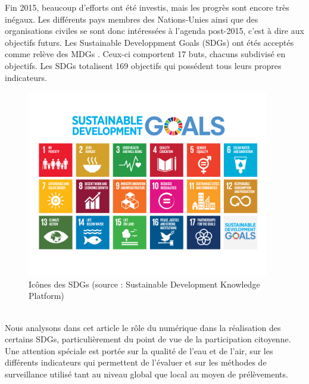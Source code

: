 \documentclass[10pt, article]{llncs}
\begin{document}
	Fin 2015, beaucoup d'efforts ont été investis, mais les progrès sont encore très inégaux. Les différents pays membres des Nations-Unies ainsi que des organisations civiles se sont donc intéressées à l'agenda post-2015, c'est à dire aux objectifs futurs. Les Sustainable Developpment Goals (SDGs) ont étés acceptés comme relève des MDGs \cite{wikipedia_sustainable_2017}. Ceux-ci comportent 17 buts, chacuns subdivisé en objectifs. Les SDGs totalisent 169 objectifs qui possédent tous leurs propres indicateurs.
	\begin{figure}
		\begin{center}
			\includegraphics[width=300pt]{img/sdgs.png}
		\end{center}
		\caption{Icônes des SDGs (source : Sustainable Development Knowledge Platform)}
	\end{figure}
	\\
	Nous analysons dans cet article le rôle du numérique dans la réalisation des certains SDGs, particulièrement du point de vue de la participation citoyenne. Une attention spéciale est portée sur la qualité de l'eau et de l'air, sur les différents indicateurs qui permettent de l'évaluer et sur les méthodes de surveillance utilisé tant au niveau global que local au moyen de prélèvements.
\end{document}
